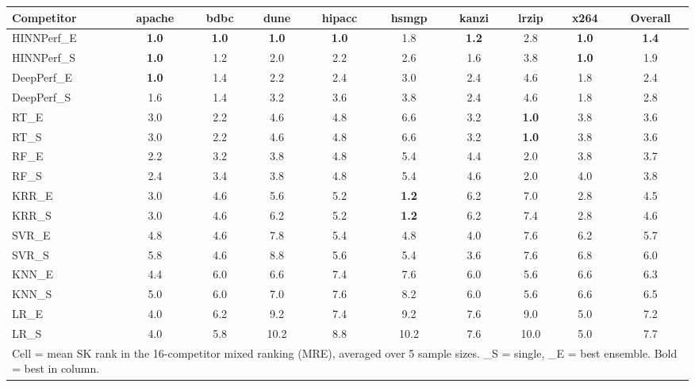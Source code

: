 \begin{tabular}{lccccccccc}
\toprule
Competitor & apache & bdbc & dune & hipacc & hsmgp & kanzi & lrzip & x264 & Overall \\
\midrule
\midrule
HINNPerf\_E & \textbf{1.0} & \textbf{1.0} & \textbf{1.0} & \textbf{1.0} & 1.8 & \textbf{1.2} & 2.8 & \textbf{1.0} & \textbf{1.4} \\
HINNPerf\_S & \textbf{1.0} & 1.2 & 2.0 & 2.2 & 2.6 & 1.6 & 3.8 & \textbf{1.0} & 1.9 \\
DeepPerf\_E & \textbf{1.0} & 1.4 & 2.2 & 2.4 & 3.0 & 2.4 & 4.6 & 1.8 & 2.4 \\
DeepPerf\_S & 1.6 & 1.4 & 3.2 & 3.6 & 3.8 & 2.4 & 4.6 & 1.8 & 2.8 \\
RT\_E & 3.0 & 2.2 & 4.6 & 4.8 & 6.6 & 3.2 & \textbf{1.0} & 3.8 & 3.6 \\
RT\_S & 3.0 & 2.2 & 4.6 & 4.8 & 6.6 & 3.2 & \textbf{1.0} & 3.8 & 3.6 \\
RF\_E & 2.2 & 3.2 & 3.8 & 4.8 & 5.4 & 4.4 & 2.0 & 3.8 & 3.7 \\
RF\_S & 2.4 & 3.4 & 3.8 & 4.8 & 5.4 & 4.6 & 2.0 & 4.0 & 3.8 \\
KRR\_E & 3.0 & 4.6 & 5.6 & 5.2 & \textbf{1.2} & 6.2 & 7.0 & 2.8 & 4.5 \\
KRR\_S & 3.0 & 4.6 & 6.2 & 5.2 & \textbf{1.2} & 6.2 & 7.4 & 2.8 & 4.6 \\
SVR\_E & 4.8 & 4.6 & 7.8 & 5.4 & 4.8 & 4.0 & 7.6 & 6.2 & 5.7 \\
SVR\_S & 5.8 & 4.6 & 8.8 & 5.6 & 5.4 & 3.6 & 7.6 & 6.8 & 6.0 \\
KNN\_E & 4.4 & 6.0 & 6.6 & 7.4 & 7.6 & 6.0 & 5.6 & 6.6 & 6.3 \\
KNN\_S & 5.0 & 6.0 & 7.0 & 7.6 & 8.2 & 6.0 & 5.6 & 6.6 & 6.5 \\
LR\_E & 4.0 & 6.2 & 9.2 & 7.4 & 9.2 & 7.6 & 9.0 & 5.0 & 7.2 \\
LR\_S & 4.0 & 5.8 & 10.2 & 8.8 & 10.2 & 7.6 & 10.0 & 5.0 & 7.7 \\
\bottomrule
\multicolumn{10}{l}{\footnotesize Cell = mean SK rank in the 16-competitor mixed ranking (MRE), averaged over 5 sample sizes. \_S = single, \_E = best ensemble. Bold = best in column.} \\
\end{tabular}
